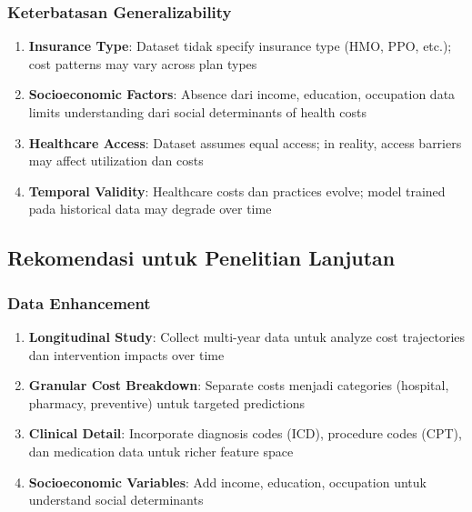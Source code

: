 \subsubsection{Keterbatasan Generalizability}

\begin{enumerate}
    \item \textbf{Insurance Type}: Dataset tidak specify insurance type (HMO, PPO, etc.); cost patterns may vary across plan types

    \item \textbf{Socioeconomic Factors}: Absence dari income, education, occupation data limits understanding dari social determinants of health costs

    \item \textbf{Healthcare Access}: Dataset assumes equal access; in reality, access barriers may affect utilization dan costs

    \item \textbf{Temporal Validity}: Healthcare costs dan practices evolve; model trained pada historical data may degrade over time
\end{enumerate}

\subsection{Rekomendasi untuk Penelitian Lanjutan}
\label{subsec:rekomendasi-lanjutan}

\subsubsection{Data Enhancement}

\begin{enumerate}
    \item \textbf{Longitudinal Study}: Collect multi-year data untuk analyze cost trajectories dan intervention impacts over time

    \item \textbf{Granular Cost Breakdown}: Separate costs menjadi categories (hospital, pharmacy, preventive) untuk targeted predictions

    \item \textbf{Clinical Detail}: Incorporate diagnosis codes (ICD), procedure codes (CPT), dan medication data untuk richer feature space

    \item \textbf{Socioeconomic Variables}: Add income, education, occupation untuk understand social determinants
\end{enumerate}

